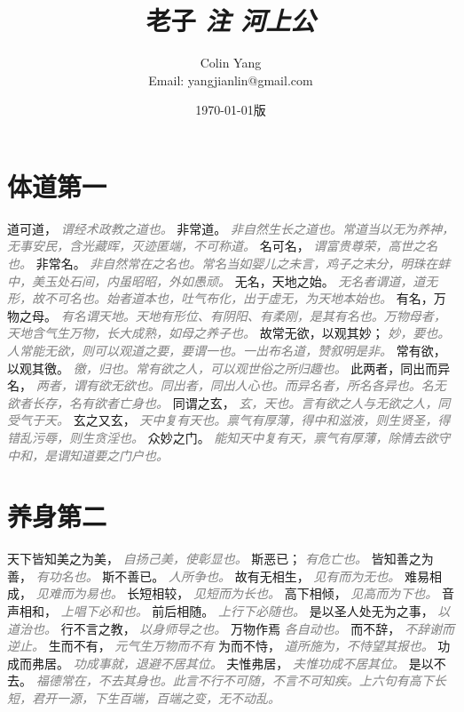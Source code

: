 \documentclass[a4paper,zihao=-4,oneside,landscape,UTF8]{ctexart}
\title{\textbf{老子}\textit{ 注 \hspace{5em}河上公}\hfil}
\author{Colin Yang \\Email: yangjianlin@gmail.com}
\date{\normalsize\today 版}
\newcommand{\zhushi}[1]{\scriptsize{\textit{\textcolor{gray}{#1}}}\normalsize}
\begin{document}
\large

\maketitle


\section{体道第一}


道可道，
\zhushi{谓经术政教之道也。}
非常道。
\zhushi{非自然生长之道也。常道当以无为养神，无事安民，含光藏晖，灭迹匿端，不可称道。}
名可名，
\zhushi{谓富贵尊荣，高世之名也。}
非常名。
\zhushi{非自然常在之名也。常名当如婴儿之未言，鸡子之未分，明珠在蚌中，美玉处石间，内虽昭昭，外如愚顽。}
无名，天地之始。
\zhushi{无名者谓道，道无形，故不可名也。始者道本也，吐气布化，出于虚无，为天地本始也。}
有名，万物之母。
\zhushi{有名谓天地。天地有形位、有阴阳、有柔刚，是其有名也。万物母者，天地含气生万物，长大成熟，如母之养子也。}
故常无欲，以观其妙；
\zhushi{妙，要也。人常能无欲，则可以观道之要，要谓一也。一出布名道，赞叙明是非。}
常有欲，以观其徼。
\zhushi{徼，归也。常有欲之人，可以观世俗之所归趣也。}
此两者，同出而异名，
\zhushi{两者，谓有欲无欲也。同出者，同出人心也。而异名者，所名各异也。名无欲者长存，名有欲者亡身也。}
同谓之玄，
\zhushi{玄，天也。言有欲之人与无欲之人，同受气于天。}
玄之又玄，
\zhushi{天中复有天也。禀气有厚薄，得中和滋液，则生贤圣，得错乱污辱，则生贪淫也。}
众妙之门。
\zhushi{能知天中复有天，禀气有厚薄，除情去欲守中和，是谓知道要之门户也。}


\section{养身第二}

天下皆知美之为美，
\zhushi{自扬己美，使彰显也。}
斯恶已；
\zhushi{有危亡也。}
皆知善之为善，
\zhushi{有功名也。}
斯不善已。
\zhushi{人所争也。}
故有无相生，
\zhushi{见有而为无也。}
难易相成，
\zhushi{见难而为易也。}
长短相较，
\zhushi{见短而为长也。}
高下相倾，
\zhushi{见高而为下也。}
音声相和，
\zhushi{上唱下必和也。}
前后相随。
\zhushi{上行下必随也。}
是以圣人处无为之事，
\zhushi{以道治也。}
行不言之教，
\zhushi{以身师导之也。}
万物作焉
\zhushi{各自动也。}
而不辞，
\zhushi{不辞谢而逆止。}
生而不有，
\zhushi{元气生万物而不有}
为而不恃，
\zhushi{道所施为，不恃望其报也。}
功成而弗居。
\zhushi{功成事就，退避不居其位。}
夫惟弗居，
\zhushi{夫惟功成不居其位。}
是以不去。
\zhushi{福德常在，不去其身也。此言不行不可随，不言不可知疾。上六句有高下长短，君开一源，下生百端，百端之变，无不动乱。}
\end{document}
